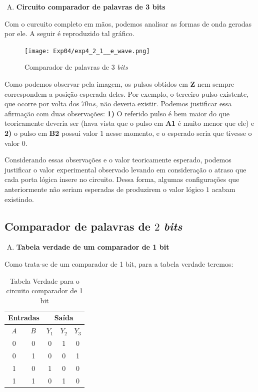 \documentclass[12pt]{article}
\begin{document}
\begin{enumerate}[E)]
\item \textbf{Circuito comparador de palavras de 3 bits}
\end{enumerate}

Com o curcuito completo em mãos, podemos analisar as formas de onda geradas por
ele. A seguir é reproduzido tal gráfico.

\begin{figure}[H]
    \centering
    \texttt{[image: Exp04/exp4\_2\_1\_\_e\_wave.png]}
    \caption{Comparador de palavras de $3$ \emph{bits}}\label{fig:exp4_2_1__e_wave.png}
\end{figure}

Como podemos observar pela imagem, os pulsos obtidos em \textbf{Z} nem sempre
correspondem a posição esperada deles. Por exemplo, o terceiro pulso existente,
que ocorre por volta dos $70 ns$, não deveria existir. Podemos justificar essa
afirmação com duas observações: \textbf{1)} O referido pulso é bem maior do que
teoricamente deveria ser (hava vista que o pulso em \textbf{A1} é muito menor
que ele) e \textbf{2)} o pulso em \textbf{B2} possui valor $1$ nesse momento, e
o esperado seria que tivesse o valor $0$.

Considerando essas observações e o valor teoricamente esperado, podemos
justificar o valor experimental observado levando em consideração o atraso que
cada porta lógica insere no circuito. Dessa forma, algumas configurações que
anteriormente não seriam esperadas de produzirem o valor lógico $1$ acabam
existindo.

\subsection{Comparador de palavras de \(2\) \emph{bits}}\label{sec:comparador_de_palavras_3_bits}

\begin{enumerate}[A)]
\item \textbf{Tabela verdade de um comparador de 1 bit}
\end{enumerate}

Como trata-se de um comparador de 1 bit, para a tabela verdade teremos:

\begin{table}[H]
    \centering
    \caption{Tabela Verdade para o circuito comparador de 1 bit}
    \begin{tabular}{|c|c|c|c|c|}\hline
    \multicolumn{2}{|c|}{Entradas} & \multicolumn{3}{|c|}{Saída} \\\hline
    \textbf{$A$} & \textbf{$B$} & \textbf{$Y_{1}$} & \textbf{$Y_{2}$} & \textbf{$Y_{3}$} \\\hline
    0 & 0 & 0 & 1 & 0 \\\hline
    0 & 1 & 0 & 0 & 1\\\hline
    1 & 0 & 1 & 0 & 0\\\hline
    1 & 1 & 0 & 1 & 0\\\hline
    \end{tabular}\label{tab:comparador_de_palavras_3_bits}
\end{table}
\end{document}
